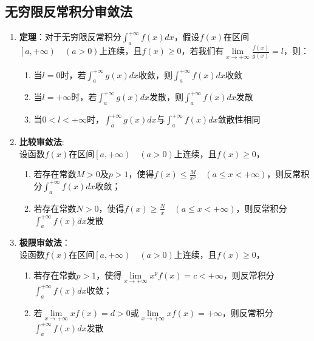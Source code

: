 \documentclass[12pt,a4paper,UTF8]{book}
\begin{document}
\subsection{无穷限反常积分审敛法}
\begin{enumerate}
\item \textbf{定理}：对于无穷限反常积分$\int_{a}^{+\infty}f\left(x\right)dx$，假设$f\left(x\right)$在区间$\left[a,+\infty\right)\quad\left(a>0\right)$上连续，且$f\left(x\right)\geq0$，若我们有$\lim\limits_{x\to+\infty}\frac{f\left(x\right)}{g\left(x\right)}=l$，则：
\begin{enumerate}
\item 当$l=0$时，若$\int_{a}^{+\infty}g\left(x\right)dx$收敛，则$\int_{a}^{+\infty}f\left(x\right)dx$收敛
\item 当$l=+\infty$时，若$\int_{a}^{+\infty}g\left(x\right)dx$发散，则$\int_{a}^{+\infty}f\left(x\right)dx$发散
\item 当$0<l<+\infty$时，$\int_{a}^{+\infty}g\left(x\right)dx$与$\int_{a}^{+\infty}f\left(x\right)dx$敛散性相同
\end{enumerate}
\item \textbf{比较审敛法}:\\
设函数$f\left(x\right)$在区间$\left[a,+\infty\right)\quad\left(a>0\right)$上连续，且$f\left(x\right)\geq0$，
\begin{enumerate}
\item 若存在常数$M>0$及$p>1$，使得$f\left(x\right)\le\frac{M}{x^p}\quad\left(a\le x<+\infty\right)$，则反常积分$\int_{a}^{+\infty}f\left(x\right)dx$收敛；
\item 若存在常数$N>0$，使得$f\left(x\right)\geq\frac{N}{x}\quad\left(a\le x<+\infty\right)$，则反常积分$\int_{a}^{+\infty}f\left(x\right)dx$发散
\end{enumerate}
\item \textbf{极限审敛法}：\\
设函数$f\left(x\right)$在区间$\left[a,+\infty\right)\quad\left(a>0\right)$上连续，且$f\left(x\right)\geq0$，
\begin{enumerate}
\item 若存在常数$p>1$，使得$\lim\limits_{x\to+\infty}x^pf\left(x\right)=c<+\infty$，则反常积分$\int_{a}^{+\infty}f\left(x\right)dx$收敛；
\item 若$\lim\limits_{x\to+\infty}xf\left(x\right)=d>0$或$\lim\limits_{x\to+\infty}{xf\left(x\right)}=+\infty$，则反常积分$\int_{a}^{+\infty}f\left(x\right)dx$发散
\end{enumerate}
\end{enumerate}
\end{document}
